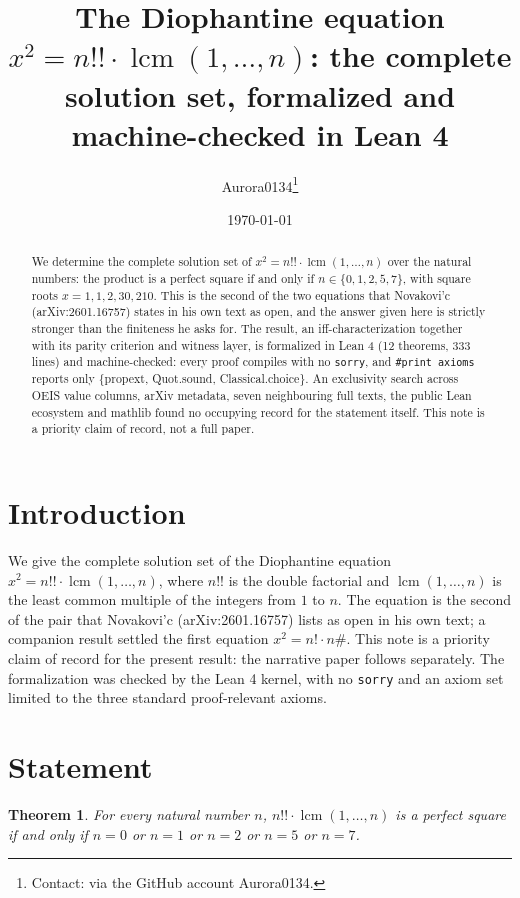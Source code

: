 \documentclass[11pt]{article}
\title{The Diophantine equation $x^2 = n!! \cdot \operatorname{lcm}(1,\dots,n)$: the complete solution set, formalized and machine-checked in Lean 4}
\author{Aurora0134\thanks{Contact: via the GitHub account Aurora0134.}}
\date{\today}
\newtheorem{theorem}{Theorem}
\begin{document}
\maketitle

\begin{abstract}
We determine the complete solution set of $x^2 = n!! \cdot \operatorname{lcm}(1,\dots,n)$ over
the natural numbers: the product is a perfect square if and only if
$n \in \{0,1,2,5,7\}$, with square roots $x = 1,1,2,30,210$. This is the second of the
two equations that Novakovi'c (arXiv:2601.16757) states in his own text as open, and the
answer given here is strictly stronger than the finiteness he asks for. The result, an
iff-characterization together with its parity criterion and witness layer, is formalized in
Lean 4 (12 theorems, 333 lines) and machine-checked: every proof compiles with no
\texttt{sorry}, and \texttt{\#print axioms} reports only
\{propext, Quot.sound, Classical.choice\}. An exclusivity search across OEIS value columns,
arXiv metadata, seven neighbouring full texts, the public Lean ecosystem and mathlib found
no occupying record for the statement itself. This note is a priority claim of record, not a
full paper.
\end{abstract}

\section{Introduction}
We give the complete solution set of the Diophantine equation
$x^2 = n!! \cdot \operatorname{lcm}(1,\dots,n)$, where $n!!$ is the double factorial and
$\operatorname{lcm}(1,\dots,n)$ is the least common multiple of the integers from $1$ to $n$.
The equation is the second of the pair that Novakovi'c (arXiv:2601.16757) lists as open in
his own text; a companion result settled the first equation
$x^2 = n! \cdot n\#$. This note is a priority claim of record for the present result: the
narrative paper follows separately. The formalization was checked by the Lean 4 kernel, with
no \texttt{sorry} and an axiom set limited to the three standard proof-relevant axioms.

\section{Statement}
\begin{theorem}\label{thm:solutionset}
For every natural number $n$, $n!! \cdot \operatorname{lcm}(1,\dots,n)$ is a perfect square
if and only if $n = 0$ or $n = 1$ or $n = 2$ or $n = 5$ or $n = 7$.
\end{theorem}
\end{document}
